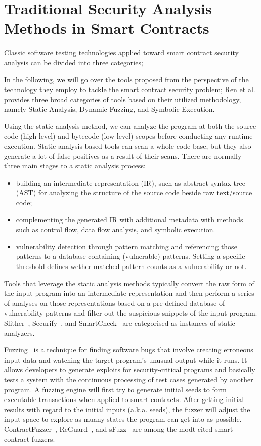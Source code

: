 \section{Traditional Security Analysis Methods in Smart Contracts}

Classic software testing technologies applied toward smart contract security analysis can be divided into three categories;

In the following, we will go over the tools proposed from the perspective of the technology they employ to tackle the smart contract security problem;
Ren et al.~\cite{Empirical-Evaluation-of-Smart-Contract-Testing:What-is-the-Best-Choice} provides three broad categories of tools based on their utilized methodology,
namely Static Analysis, Dynamic Fuzzing, and Symbolic Execution.

Using the static analysis method, we can analyze the program at both the source code (high-level) and bytecode (low-level) scopes before conducting any runtime execution.
Static analysis-based tools can scan a whole code base, but they also generate a lot of false positives as a result of their scans.
There are normally three main stages to a static analysis process:
\begin{itemize}
  \item building an intermediate representation (IR), such as abstract syntax tree (AST) for analyzing the structure of the source code beside raw text/source code;
  \item complementing the generated IR with additional metadata with methods such as control flow, data flow analysis, and symbolic execution.
  \item vulnerability detection through pattern matching and referencing those patterns to a database containing (vulnerable) patterns. Setting a specific threshold defines wether matched pattern counts as a vulnerability or not.
\end{itemize}
Tools that leverage the static analysis methods typically convert the raw form of the input program into an intermediate representation and then perform a series of analyses on those representations based on a pre-defined database of vulnerability patterns and filter out the suspicious snippets of the input program.
Slither~\cite{slither}, Securify~\cite{securify}, and SmartCheck~\cite{securify} are categorised as instances of static analyzers.

Fuzzing~\cite{chen2018systematic} is a technique for finding software bugs that involve creating erroneous input data and watching the target program's unusual output while it runs.
It allows developers to generate exploits for security-critical programs and basically tests a system with the continuous processing of test cases generated by another program.
A fuzzing engine will first try to generate initial seeds to form executable transactions when applied to smart contracts.
After getting initial results with regard to the initial inputs (a.k.a. seeds), the fuzzer will adjust the input space to explore as muany states the program can get into as possible.
ContractFuzzer~\cite{contractfuzzer}, ReGuard~\cite{liu2018reguard}, and sFuzz~\cite{nguyen2020sfuzz} are among the modt cited smart contract fuzzers.

